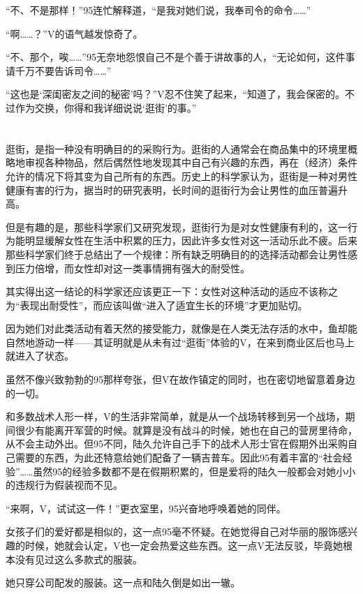 “不、不是那样！”95连忙解释道，“是我对她们说，我奉司令的命令……”

“啊……？”V的语气越发惊奇了。

“不、那个，唉……”95无奈地怨恨自己不是个善于讲故事的人，“无论如何，这件事请千万不要告诉司令……”

“这也是‘深闺密友之间的秘密’吗？”V忍不住笑了起来，“知道了，我会保密的。不过作为交换，你得和我详细说说‘逛街’的事。”



\section*{}

逛街，是指一种没有明确目的的采购行为。逛街的人通常会在商品集中的环境里概略地审视各种物品，然后偶然性地发现其中自己有兴趣的东西，再在（经济）条件允许的情况下将其变为自己所有的东西。历史上的科学家认为，逛街是一种对男性健康有害的行为，据当时的研究表明，长时间的逛街行为会让男性的血压普遍升高。

但是有趣的是，那些科学家们又研究发现，逛街行为是对女性健康有利的，这一行为能明显缓解女性在生活中积累的压力，因此许多女性对这一活动乐此不疲。后来那些科学家们终于总结出了一个规律：所有缺乏明确目的的选择活动都会让男性感到压力倍增，而女性却对这一类事情拥有强大的耐受性。

其实得出这一结论的科学家还应该更正一下：女性对这种活动的适应不该称之为“表现出耐受性”，而应该叫做“进入了适宜生长的环境”才更加贴切。

因为她们对此类活动有着天然的接受能力，就像是在人类无法存活的水中，鱼却能自然地游动一样——其证明就是从未有过“逛街”体验的V，在来到商业区后也马上就进入了状态。

虽然不像兴致勃勃的95那样夸张，但V在故作镇定的同时，也在密切地留意着身边的一切。

和多数战术人形一样，V的生活非常简单，就是从一个战场转移到另一个战场，期间很少有能离开军营的时候。就算是没有战斗的时候，她也在自己的营房里待命，从不会主动外出。但95不同，陆久允许自己手下的战术人形士官在假期外出采购自己需要的东西，为此还特意给她们配备了一辆吉普车。因此95有着丰富的“社会经验”……虽然95的经验多数都不是在假期积累的，但是爱将的陆久一般都会对她小小的违规行为假装视而不见。

“来啊，V，试试这一件！”更衣室里，95兴奋地呼唤着她的同伴。

女孩子们的爱好都是相似的，这一点95毫不怀疑。在她觉得自己对华丽的服饰感兴趣的时候，她就会认定，V也一定会热爱这些东西。这一点V无法反驳，毕竟她根本没有见过这么多款式的服装。

她只穿公司配发的服装。这一点和陆久倒是如出一辙。

